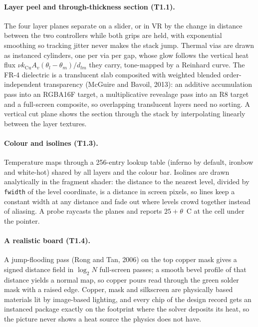 \paragraph{Layer peel and through-thickness section (T1.1).} The four layer planes separate on a
slider, or in VR by the change in distance between the two controllers while both grips are held,
with exponential smoothing so tracking jitter never makes the stack jump. Thermal vias are drawn as
instanced cylinders, one per via per gap, whose glow follows the vertical heat flux
$\nu k_{\mathrm{Cu}} A_v(\theta_l-\theta_m)/d_{lm}$ they carry, tone-mapped by a Reinhard curve.
The FR-4 dielectric is a translucent slab composited with weighted blended order-independent
transparency (McGuire and Bavoil, 2013): an additive accumulation pass into an RGBA16F target, a
multiplicative revealage pass into an R8 target and a full-screen composite, so overlapping
translucent layers need no sorting. A vertical cut plane shows the section through the stack by
interpolating linearly between the layer textures.

\paragraph{Colour and isolines (T1.3).} Temperature maps through a 256-entry lookup table
(inferno by default, ironbow and white-hot) shared by all layers and the colour bar. Isolines are
drawn analytically in the fragment shader: the distance to the nearest level, divided by
\texttt{fwidth} of the level coordinate, is a distance in screen pixels, so lines keep a constant
width at any distance and fade out where levels crowd together instead of aliasing. A probe
raycasts the planes and reports $25+\theta$~\textdegree C at the cell under the pointer.

\paragraph{A realistic board (T1.4).} A jump-flooding pass (Rong and Tan, 2006) on the top copper
mask gives a signed distance field in $\log_2 N$ full-screen passes; a smooth bevel profile of that
distance yields a normal map, so copper pours read through the green solder mask with a raised
edge. Copper, mask and silkscreen are physically based materials lit by image-based lighting,
and every chip of the design record gets an instanced package exactly on the footprint where the
solver deposits its heat, so the picture never shows a heat source the physics does not have.

